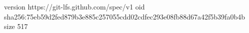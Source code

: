 version https://git-lfs.github.com/spec/v1
oid sha256:75eb59d2fed879b3e885c257055cdd02cdfec293e08fb88d67a42f5b39fa0b4b
size 517
